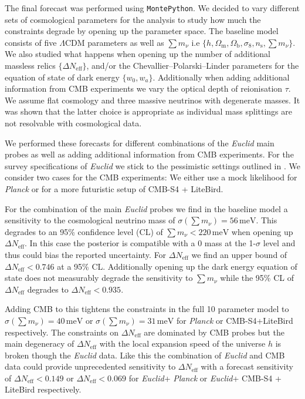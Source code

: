 \documentclass[a4paper,11pt]{article}
\newcommand{\euclid}{\textit{Euclid}\xspace}
\newcommand{\planck}{\textit{Planck}\xspace}
\newcommand{\dneff}{\Delta N_\mathrm{eff}}
\newcommand{\summnu}{\sum m_\nu}
\newcommand{\montepython}{\texttt{MontePython}\xspace}
\begin{document}
The final forecast was performed using \montepython. We decided to vary different sets of cosmological parameters for the analysis to study how much the constraints degrade by opening up the parameter space. The baseline model consists of  five $\varLambda$CDM parameters as well as $\summnu$ i.e $\{h, \Omega_\mathrm{m}, \Omega_\mathrm{b}, \sigma_8, n_\mathrm{s}, \summnu\}$. We also studied what happens when opening up the number of additional massless relics $\{\dneff\}$, and/or the Chevallier--Polarski--Linder parameters for the equation of state of dark energy $\{w_0,w_a\}$. Additionally when adding additional information from CMB experiments we vary the optical depth of reionisation $\tau$. We assume flat cosmology and three massive neutrinos with degenerate masses. It was shown that the latter choice is appropriate as individual mass splittings are not resolvable with cosmological data\cite{Lesgourgues:2013sjj}.

We performed these forecasts for different combinations of the \euclid main probes as well as adding additional information from CMB experiments. For the survey specifications of \euclid we stick to the pessimistic settings outlined in \cite{ISTF2020}. We consider two cases for the CMB experiments: We either use a mock likelihood for \planck or for a more futuristic setup of CMB-S4 + LiteBird.

For the combination of the main \euclid probes we find in the baseline model a sensitivity to the cosmological neutrino mass of $\sigma\left(\summnu\right) = 56\,\mathrm{meV}$. This degrades to an 95\% confidence level (CL) of $\summnu<220\,\mathrm{meV}$ when opening up $\dneff$. In this case the posterior is compatible with a 0 mass at the 1-$\sigma$ level and thus could bias the reported uncertainty. For $\dneff$ we find an upper bound of $\dneff<0.746$ at a 95\% CL. Additionally opening up the dark energy equation of state does not measurably degrade the sensitivity to $\summnu$ while the 95\% CL of $\dneff$ degrades to $\dneff<0.935$.  

Adding CMB to this tightens the constraints in the full 10 parameter model to $\sigma\left(\summnu\right) = 40\,\mathrm{meV}$ or $\sigma\left(\summnu\right) = 31\,\mathrm{meV}$ for \planck or CMB-S4+LiteBird respectively. The constraints on $\dneff$ are dominated by CMB probes but the main degeneracy of $\dneff$ with the local expansion speed of the universe $h$ is broken though the \euclid data. Like this the combination of \euclid and CMB data could provide unprecedented sensitivity to $\dneff$ with a forecast sensitivity of $\dneff<0.149$ or $\dneff<0.069$ for \euclid + \planck or \euclid + CMB-S4 + LiteBird respectively. 
\end{document}
